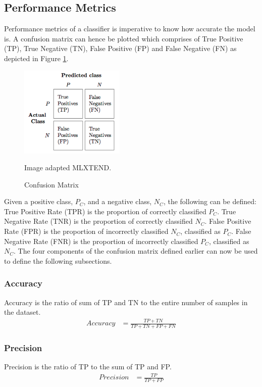 \documentclass[a4paper,12pt,twoside]{report}
\begin{document}
\subsection{Performance Metrics}
Performance metrics of a classifier is imperative to know how accurate the model is. A confusion matrix can hence be plotted which comprises of True Positive (TP), True Negative (TN), False Positive (FP) and False Negative (FN) as depicted in Figure \ref{fig:confusion-matrix}.
\begin{figure}[h] %
    \centering
    \includegraphics[width=5cm]{confusion_matrix}
    \caption{Confusion Matrix}
    \small Image adapted MLXTEND\footnotemark.
    \label{fig:confusion-matrix}
\end{figure}
\bigbreak
Given a positive class, $P_C$, and a negative class, $N_C$, the following can be defined:
\bigbreak
True Positive Rate (TPR) is the proportion of correctly classified $P_C$. True Negative Rate (TNR) is the proportion of correctly classified $N_C$. False Positive Rate (FPR) is the proportion of incorrectly classified $N_C$, classified as $P_C$. False Negative Rate (FNR) is the proportion of incorrectly classified $P_C$, classified as $N_C$. The four components of the confusion matrix defined earlier can now be used to define the following subsections.

\subsubsection{Accuracy} 
Accuracy is the ratio of sum of TP and TN to the entire number of samples in the dataset.
\begin{align*}
Accuracy &= \frac{ TP + TN}{TP + TN + FP + FN}
\end{align*}

\subsubsection{Precision} 
Precision is the ratio of TP to the sum of TP and FP.
\begin{align*}
Precision &= \frac{TP}{TP + FP}
\end{align*}
\end{document}

